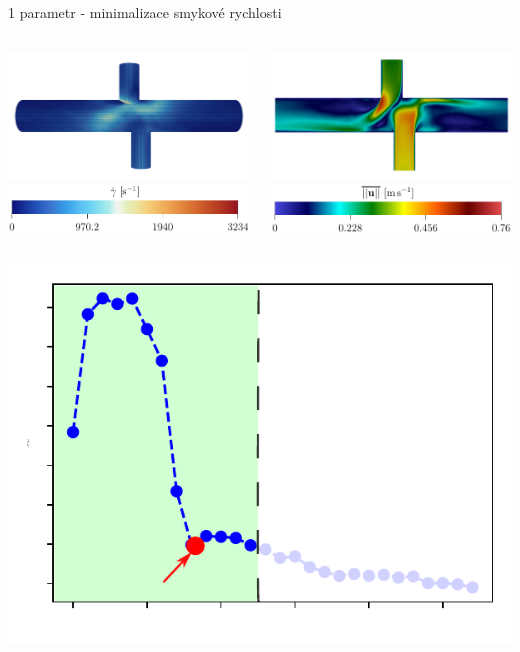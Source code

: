 \documentclass[aspectratio=169,xcolor=dvipsnames]{beamer}
\begin{document}
\begin{frame}{1 parametr - minimalizace smykové rychlosti}
	\begin{columns}
		\begin{column}{.5\textwidth}
			\centering
			\includegraphics[width=1\linewidth, trim={0 0 0 0}, clip]{Images/08stress-side.pdf}
			\includegraphics[width=0.65\linewidth, trim={0 0 0 0}, clip]{Images/stress_leg.pdf}			
		\end{column}
		\begin{column}{.5\textwidth}
			\centering
			\includegraphics[width=1\linewidth, trim={0 0 0 0}, clip]{Images/08velocity-side.pdf}
			\includegraphics[width=0.65\linewidth, trim={0 0 0 0}, clip]{Images/mean_velocity_leg.pdf}
		\end{column}
	\end{columns}	
	\vspace{3mm}
	\begin{center}
		\includegraphics[width=.18\linewidth, trim={0 0 0 0}, clip]{Images/stress-mini.pdf}
	\end{center}	
\end{frame}
\end{document}
